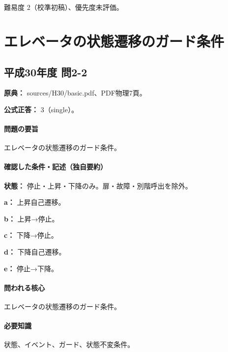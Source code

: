\par 難易度 2（校準初稿）、優先度未評価。

\section{エレベータの状態遷移のガード条件}

\subsection{平成30年度 問2-2}
\label{q:h30-reg-basic-2-2}

\noindent\textbf{原典：} sources/H30/basic.pdf、PDF物理7頁。

\textbf{公式正答：} 3（single）。

\paragraph{問題の要旨} エレベータの状態遷移のガード条件。

\paragraph{確認した条件・記述（独自要約）}\mbox{}\par

\noindent\textbf{状態：} 停止・上昇・下降のみ。扉・故障・別階呼出を除外。\par

\noindent\textbf{a：} 上昇自己遷移。\par

\noindent\textbf{b：} 上昇→停止。\par

\noindent\textbf{c：} 下降→停止。\par

\noindent\textbf{d：} 下降自己遷移。\par

\noindent\textbf{e：} 停止→下降。\par

\paragraph{問われる核心} エレベータの状態遷移のガード条件。

\paragraph{必要知識} 状態、イベント、ガード、状態不変条件。

